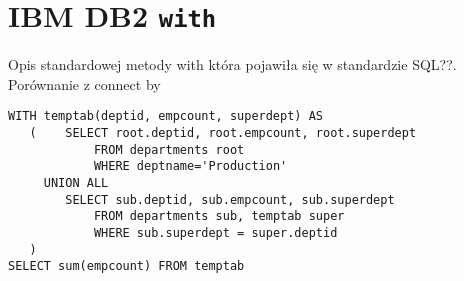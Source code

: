 \section{IBM DB2 \texttt{with}}


Opis standardowej metody with która pojawiła się w standardzie SQL??. Porównanie z connect by

\begin{verbatim}
WITH temptab(deptid, empcount, superdept) AS
   (    SELECT root.deptid, root.empcount, root.superdept
            FROM departments root
            WHERE deptname='Production'
     UNION ALL
        SELECT sub.deptid, sub.empcount, sub.superdept
            FROM departments sub, temptab super
            WHERE sub.superdept = super.deptid
   )
SELECT sum(empcount) FROM temptab
\end{verbatim}

